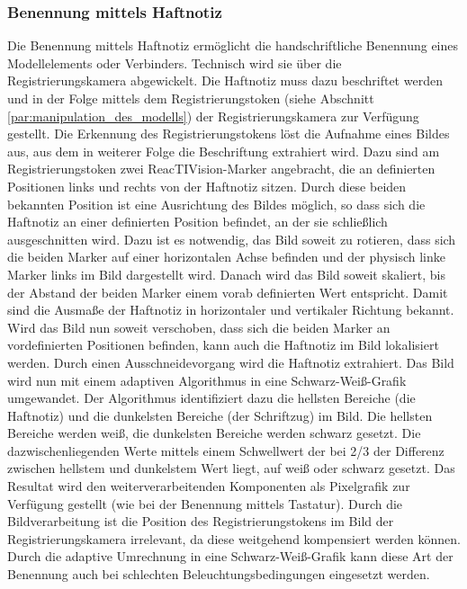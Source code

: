 
\subsubsection{Benennung mittels Haftnotiz} %
\label{ssub:benennung_mittels_haftnotiz}

Die Benennung mittels Haftnotiz ermöglicht die handschriftliche Benennung eines Modellelements oder Verbinders. Technisch wird sie über die Registrierungskamera abgewickelt. Die Haftnotiz muss dazu beschriftet werden und in der Folge mittels dem Registrierungstoken (siehe Abschnitt \ref{par:manipulation_des_modells}) der Registrierungskamera zur Verfügung gestellt. Die Erkennung des Registrierungstokens löst die Aufnahme eines Bildes aus, aus dem in weiterer Folge die Beschriftung extrahiert wird. Dazu sind am Registrierungstoken zwei ReacTIVision-Marker angebracht, die an definierten Positionen links und rechts von der Haftnotiz sitzen. Durch diese beiden bekannten Position ist eine Ausrichtung des Bildes möglich, so dass sich die Haftnotiz an einer definierten Position befindet, an der sie schließlich ausgeschnitten wird. Dazu ist es notwendig, das Bild soweit zu rotieren, dass sich die beiden Marker auf einer horizontalen Achse befinden und der physisch linke Marker links im Bild dargestellt wird. Danach wird das Bild soweit skaliert, bis der Abstand der beiden Marker einem vorab definierten Wert entspricht. Damit sind die Ausmaße der Haftnotiz in horizontaler und vertikaler Richtung bekannt. Wird das Bild nun soweit verschoben, dass sich die beiden Marker an vordefinierten Positionen befinden, kann auch die Haftnotiz im Bild lokalisiert werden. Durch einen Ausschneidevorgang wird die Haftnotiz extrahiert. Das Bild wird nun mit einem adaptiven Algorithmus in eine Schwarz-Weiß-Grafik umgewandet. Der Algorithmus identifiziert dazu die hellsten Bereiche (die Haftnotiz) und die dunkelsten Bereiche (der Schriftzug) im Bild. Die hellsten Bereiche werden weiß, die dunkelsten Bereiche werden schwarz gesetzt. Die dazwischenliegenden Werte mittels einem Schwellwert der bei 2/3 der Differenz zwischen hellstem und dunkelstem Wert liegt, auf weiß oder schwarz gesetzt. Das Resultat wird den weiterverarbeitenden Komponenten als Pixelgrafik zur Verfügung gestellt (wie bei der Benennung mittels Tastatur). Durch die Bildverarbeitung ist die Position des Registrierungstokens im Bild der Registrierungskamera irrelevant, da diese weitgehend kompensiert werden können. Durch die adaptive Umrechnung in eine Schwarz-Weiß-Grafik kann diese Art der Benennung auch bei schlechten Beleuchtungsbedingungen eingesetzt werden.

